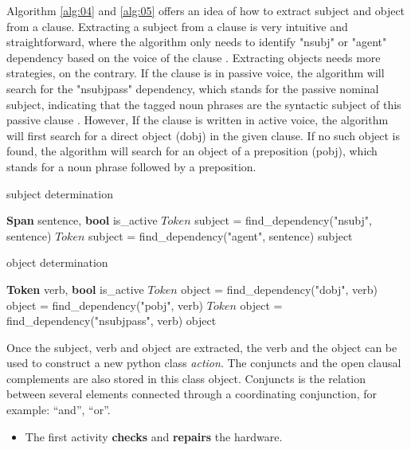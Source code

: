 Algorithm \ref{alg:04} and \ref{alg:05} offers an idea of how to extract subject and object from a clause. Extracting a subject from a clause is very intuitive and straightforward, where the algorithm only needs to identify "nsubj" or "agent" dependency based on the voice of the clause \cite{t2m_1_main}. Extracting objects needs more strategies, on the contrary. If the clause is in passive voice, the algorithm will search for the "nsubjpass" dependency, which stands for the passive nominal subject, indicating that the tagged noun phrases are the syntactic subject of this passive clause \cite{dependencies_manual}. However, If the clause is written in active voice, the algorithm will first search for a direct object (dobj) in the given clause. If no such object is found, the algorithm will search for an object of a preposition (pobj), which stands for a noun phrase followed by a preposition.

\begin{algorithm}
\caption{subject determination}
\label{alg:04}
	\begin{algorithmic} [1]
		\REQUIRE \textbf{Span} sentence, \textbf{bool} is\_active
		\STATE $Token$ subject = find\_dependency("nsubj", sentence)
		\ELSE 
		\STATE $Token$ subject = find\_dependency("agent", sentence)
		\ENDIF
		\RETURN subject

	\end{algorithmic}
\end{algorithm}

\begin{algorithm}
\caption{object determination}
\label{alg:05}
	\begin{algorithmic} [1]
		\REQUIRE \textbf{Token} verb, \textbf{bool} is\_active
		\STATE $Token$ object = find\_dependency("dobj", verb)
		\STATE object = find\_dependency("pobj", verb)
		\ENDIF
		\ELSE 
		\STATE $Token$ object = find\_dependency("nsubjpass", verb)
		\ENDIF
		\RETURN object
	\end{algorithmic}
\end{algorithm}

Once the subject, verb and object are extracted, the verb and the object can be used to construct a new python class \textit{action}. The conjuncts and the open clausal complements are also stored in this class object. Conjuncts is the relation between several elements connected through a coordinating conjunction, for example: “and”, “or”. 

\begin{itemize}
    \item The first activity \textbf{checks} and \textbf{repairs} the hardware.
\end{itemize}

